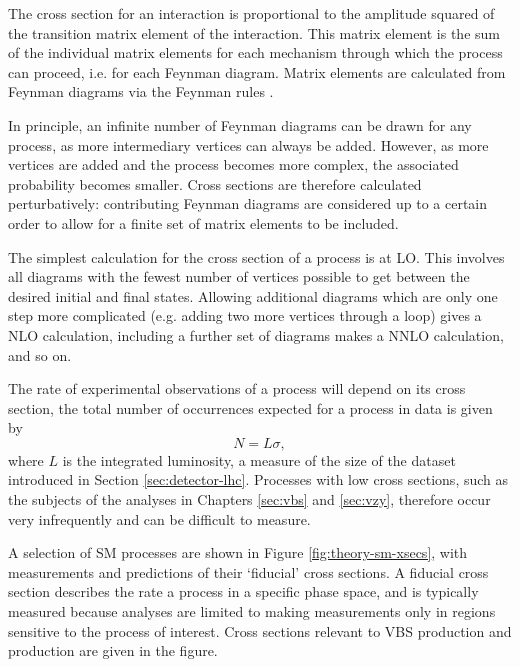 The cross section for an interaction is proportional to the amplitude squared of
the transition matrix element of the interaction. This matrix element is the
sum of the individual matrix elements for each mechanism through which the
process can proceed, i.e. for each Feynman diagram. Matrix elements are
calculated from Feynman diagrams via the Feynman rules \cite{Feynman1949}.

In principle, an infinite number of Feynman diagrams can be drawn for any
process, as more intermediary vertices can always be added. However, as more
vertices are added and the process becomes more complex, the associated
probability becomes smaller. Cross sections are therefore calculated
perturbatively: contributing Feynman diagrams are considered up to a certain
order to allow for a finite set of matrix elements to be included.

The simplest calculation for the cross section of a process is at \ac{LO}.
This involves all diagrams with the
fewest number of vertices possible to get between the desired initial and final
states.
Allowing additional diagrams which are only one step more complicated (e.g.
adding two more vertices through a loop) gives a \ac{NLO} calculation, including
a further set of diagrams makes a \ac{NNLO} calculation, and so on.

The rate of experimental observations of a process will depend on its cross
section, the total number of occurrences expected for a process in data is given
by
\begin{equation*}
  N = L\sigma,
\end{equation*}
where $L$ is the integrated luminosity, a measure of the size of the dataset
introduced in Section \ref{sec:detector-lhc}. Processes with low cross sections,
such as the subjects of the analyses in Chapters \ref{sec:vbs} and
\ref{sec:vzy}, therefore occur very infrequently and can be difficult to
measure.


A selection of \ac{SM} processes are shown in Figure \ref{fig:theory-sm-xsecs},
with measurements and predictions of their `fiducial' cross sections.  A
fiducial cross section describes the rate a process in a specific phase space,
and is typically measured because analyses are limited to making measurements
only in regions sensitive to the process of interest. Cross sections relevant to
\ac{VBS} \Zy production and \VZy production are given in the figure.

